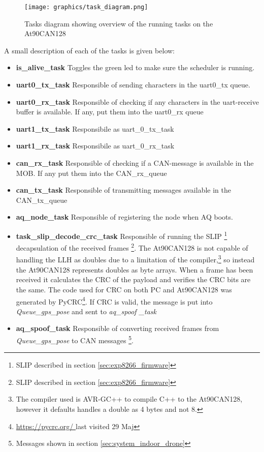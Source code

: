 \begin{figure}[H]
    \center
    \texttt{[image: graphics/task\_diagram.png]}
  \caption{Tasks diagram showing overview of the running tasks on the At90CAN128}
    \label{fig:task_diagram_atmega}
\end{figure}
A small description of each of the tasks is given below:
\begin{itemize}
\item \textbf{is\_alive\_task} Toggles the green led to make sure the scheduler is running.
\item \textbf{uart0\_tx\_task} Responsible of sending characters in the uart0\_tx queue.
\item \textbf{uart0\_rx\_task} Responsible of checking if any characters in the uart-receive buffer is available. If any, put them into the uart0\_rx queue
\item \textbf{uart1\_tx\_task} Responsibile as uart\_0\_tx\_task
\item \textbf{uart1\_rx\_task} Responsibile as uart\_0\_rx\_task
\item \textbf{can\_rx\_task} Responsible of checking if a CAN-message is available in the MOB. If any put them into the CAN\_rx\_queue
\item \textbf{can\_tx\_task} Responsible of transmitting messages available in the CAN\_tx\_queue
\item \textbf{aq\_node\_task} Responsible of registering the node when AQ boots.
\item \textbf{task\_slip\_decode\_crc\_task} Responsible of running the SLIP \footnote{SLIP described in section \ref{sec:exp8266_firmware}} decapsulation of the received frames \footnote{SLIP described in section \ref{sec:exp8266_firmware}}. The At90CAN128 is not capable of handling the \ac{LLH} as doubles due to a limitation of the compiler,\footnote{The compiler used is AVR-GC++ to compile C++ to the At90CAN128, however it defaults handles a double as 4 bytes and not 8.} so instead the At90CAN128 represents doubles as byte arrays.
When a frame has been received it calculates the CRC of the payload and verifies the CRC bits are the same. The code used for CRC on both PC and At90CAN128 was generated by PyCRC\footnote{\url{https://pycrc.org/ }last visited 29 Maj}.
If CRC is valid, the message is put into \textit{Queue\_gps\_pose} and sent to \textit{aq\_spoof \_task}
\item \textbf{ aq\_spoof\_task} Responsible of converting  received frames from \textit{Queue\_gps\_pose} to CAN messages \footnote{Messages shown in section \ref{sec:system_indoor_drone}}.
\end{itemize}

